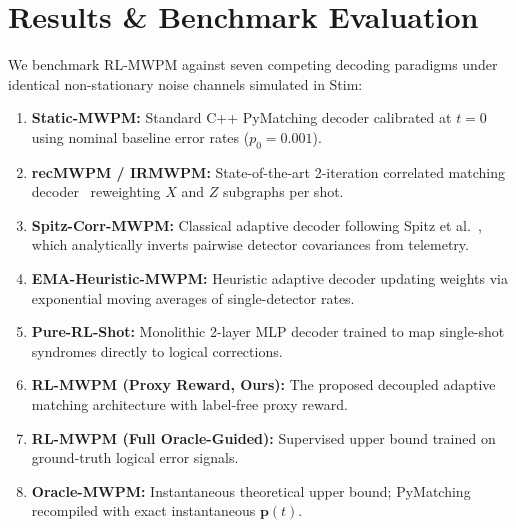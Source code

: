 \documentclass[aps,prxquantum,reprint,superscriptaddress,floatfix,nofootinbib]{revtex4-2}
\begin{document}
\section{Results \& Benchmark Evaluation}
\label{sec:results}

We benchmark RL-MWPM against seven competing decoding paradigms under identical non-stationary noise channels simulated in Stim:
\begin{enumerate}
    \item \textbf{Static-MWPM:} Standard C++ PyMatching decoder calibrated at $t=0$ using nominal baseline error rates ($p_0 = 0.001$).
    \item \textbf{recMWPM / IRMWPM:} State-of-the-art 2-iteration correlated matching decoder~\cite{cowtan2023correlated,tian2025iterative} reweighting $X$ and $Z$ subgraphs per shot.
    \item \textbf{Spitz-Corr-MWPM:} Classical adaptive decoder following Spitz et al.~\cite{spitz2018adaptive}, which analytically inverts pairwise detector covariances from telemetry.
    \item \textbf{EMA-Heuristic-MWPM:} Heuristic adaptive decoder updating weights via exponential moving averages of single-detector rates.
    \item \textbf{Pure-RL-Shot:} Monolithic 2-layer MLP decoder trained to map single-shot syndromes directly to logical corrections.
    \item \textbf{RL-MWPM (Proxy Reward, Ours):} The proposed decoupled adaptive matching architecture with label-free proxy reward.
    \item \textbf{RL-MWPM (Full Oracle-Guided):} Supervised upper bound trained on ground-truth logical error signals.
    \item \textbf{Oracle-MWPM:} Instantaneous theoretical upper bound; PyMatching recompiled with exact instantaneous $\mathbf{p}(t)$.
\end{enumerate}
\end{document}
